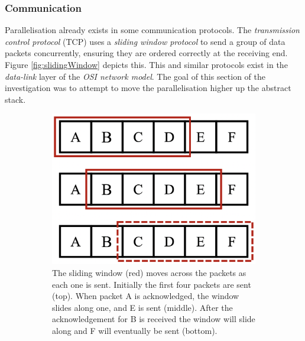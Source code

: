 \setlength{\leftskip}{0cm}
\subsubsection{Communication}
\setlength{\leftskip}{0.5cm}
\indent \indent
Parallelisation already exists in some communication protocols. The \textit{transmission control protocol} (TCP) uses a \textit{sliding window protocol} to send a group of data packets concurrently, ensuring they are ordered correctly at the receiving end. Figure \ref{fig:slidingWindow} depicts this. This and similar protocols exist in the \textit{data-link} layer of the \textit{OSI network model}. The goal of this section of the investigation was to attempt to move the parallelisation higher up the abstract stack.
\begin{figure}[htp]
    \begin{subfigure}[b]{0.45\textwidth}
        \centering
        \includegraphics[scale=0.3]{figures/slidingWindow1}
        \caption{The sliding window (red) moves across the packets as each one is sent. Initially the first four packets are sent (top). When packet A is acknowledged, the window slides along one, and E is sent (middle). After the acknowledgement for B is received the window will slide along and F will eventually be sent (bottom).}
    \end{subfigure}\hfill%
    \begin{subfigure}[b]{0.45\textwidth}
        \centering

\end{subfigure}
\end{figure}
